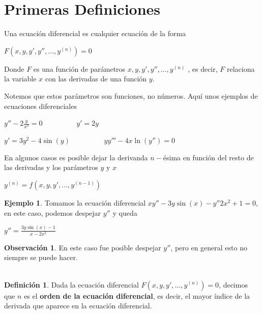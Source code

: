 \documentclass{article}
\theoremstyle{plain}
\theoremstyle{definition}
\newtheorem{defin}[thm]{Definición}
\newtheorem{ejem}[thm]{Ejemplo}
\newtheorem{rmk}[thm]{Observación}
\begin{document}
\section{Primeras Definiciones }

Una ecuación diferencial es cualquier ecuación de la forma

\begin{center}
$F(x,y,y',y'',... , y^{(n)})=0$
\end{center}

Donde $F$ es una función de parámetros $x,y,y',y'',... , y^{(n)}$ , es decir, $F$ relaciona la variable $x$ con las derivadas de una función $y$.

Notemos que estos parámetros son funciones, no números. Aquí unos ejemplos de ecuaciones diferenciales

\begin{center}
$\displaystyle y''-2\frac{y}{x^2}=0 \hspace{2cm} \displaystyle y'=2y$ \newline

$\displaystyle y'=3y^2-4\sin(y)\hspace{2cm} \displaystyle yy'''-4x\ln(y'')=0$ \newline
\end{center}

En algunos casos es posible dejar la derivanda $n-$ésima en función del resto de las derivadas y los parámetros $y$ y $x$

\begin{center}
$y^{(n)}=f(x,y,y',... ,y^{(n-1)})$
\end{center}

\begin{ejem}Tomamos la ecuación diferencial $xy''-3y\sin(x)-y''2x^2+1=0$, en este caso, podemos despejar $y''$ y queda
\end{ejem}

\begin{center}
$\displaystyle y''= \frac{3y\sin(x)-1}{x-2x^2}$
\end{center}


\begin{rmk}En este caso fue posible despejar $y''$, pero en general esto no siempre se puede hacer. \\  \ \\
\end{rmk}

\begin{defin}Dada la ecuación diferencial $F(x,y,y',...,y^{(n)})=0$, decimos que $n$ es el \textbf{orden de la ecuación diferencial}, es decir, el mayor índice de la derivada que aparece en la ecuación diferencial. \\
\end{defin}
\end{document}

